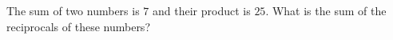 The sum of two numbers is $7$ and their product is $25$. What is the sum of the reciprocals of these numbers?
